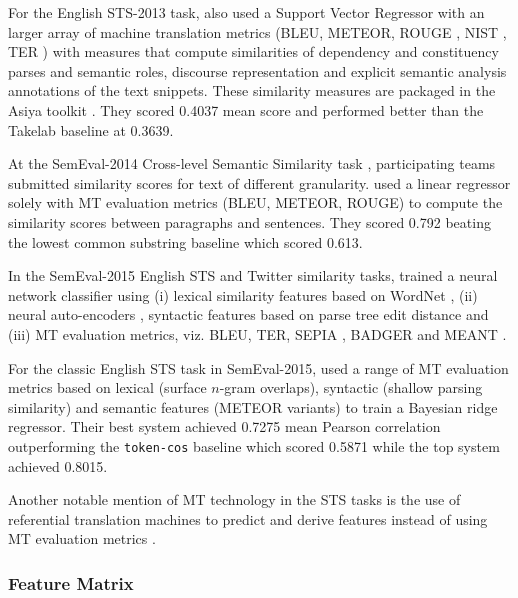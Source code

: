 For the English STS-2013 task, \cite{Barron-Cedeno2013} also used a Support Vector Regressor with an larger array of machine translation metrics (BLEU, METEOR, ROUGE \citep{lin-och:2004:ACL}, NIST \citep{doddington2002automatic}, TER \citep{snover2006study}) with measures that compute similarities of dependency and constituency parses \citep{liu2005syntactic} and semantic roles, discourse representation and explicit semantic analysis \citep{gabrilovich2007computing} annotations of the text snippets. These similarity measures are packaged in the Asiya toolkit \citep{Gimenez2010}. They scored 0.4037 mean score and performed better than the Takelab baseline \citep{vsaric2012takelab} at 0.3639.

At the SemEval-2014 Cross-level Semantic Similarity task \citep{jurgens2014crosssts,Jurgens2015}, participating teams submitted similarity scores for text of different granularity. \cite{Huang2014} used a linear regressor solely with MT evaluation metrics (BLEU, METEOR, ROUGE) to compute the similarity scores between  paragraphs and sentences. They scored 0.792 beating the lowest common substring baseline which scored 0.613.

In the SemEval-2015 English STS and Twitter similarity tasks, \citep{berterofung2015} trained a neural network classifier using (i) lexical similarity features based on WordNet \citep{miller1995wordnet}, (ii) neural auto-encoders \citep{socher2011dynamic}, syntactic features based on parse tree edit distance \citep{zhang1989simple,wan2006using} and (iii) MT evaluation metrics, viz. BLEU, TER, SEPIA \citep{habash2008sepia}, BADGER \citep{parker2008badger} and MEANT \citep{lo2012fully}.

For the classic English STS task in SemEval-2015, \cite{usaarsheff2015} used a range of MT evaluation metrics based on lexical (surface $n$-gram overlaps), syntactic (shallow parsing similarity) and semantic features (METEOR variants) to train a Bayesian ridge regressor. Their best system achieved 0.7275 mean Pearson correlation outperforming the {\tt token-cos} baseline which scored 0.5871 while the top system \citep{sultan2015} achieved 0.8015.

Another notable mention of MT technology in the STS tasks is the use of referential translation machines to predict and derive features instead of using MT evaluation metrics \citep{Bicici2013,Bicici2014,bicici2015}.

\subsubsection{Feature Matrix}

